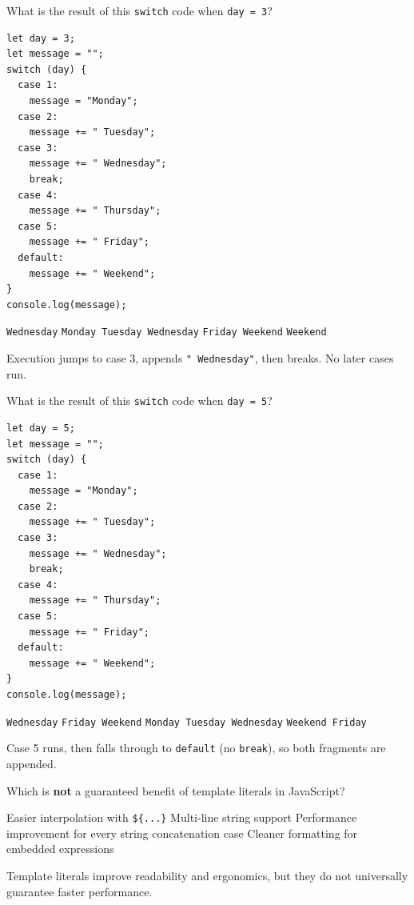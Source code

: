 \question[4]
What is the result of this \texttt{switch} code when \texttt{day = 3}?
\begin{lstlisting}[style=js]
let day = 3;
let message = "";
switch (day) {
  case 1:
    message = "Monday";
  case 2:
    message += " Tuesday";
  case 3:
    message += " Wednesday";
    break;
  case 4:
    message += " Thursday";
  case 5:
    message += " Friday";
  default:
    message += " Weekend";
}
console.log(message);
\end{lstlisting}
\begin{choices}
  \CorrectChoice \texttt{Wednesday}
  \choice \texttt{Monday Tuesday Wednesday}
  \choice \texttt{Friday Weekend}
  \choice \texttt{Weekend}
\end{choices}
\begin{solution}
  Execution jumps to case 3, appends \texttt{" Wednesday"}, then breaks. No later cases run.
\end{solution}

\question[4]
What is the result of this \texttt{switch} code when \texttt{day = 5}?
\begin{lstlisting}[style=js]
let day = 5;
let message = "";
switch (day) {
  case 1:
    message = "Monday";
  case 2:
    message += " Tuesday";
  case 3:
    message += " Wednesday";
    break;
  case 4:
    message += " Thursday";
  case 5:
    message += " Friday";
  default:
    message += " Weekend";
}
console.log(message);
\end{lstlisting}
\begin{choices}
  \choice \texttt{Wednesday}
  \CorrectChoice \texttt{Friday Weekend}
  \choice \texttt{Monday Tuesday Wednesday}
  \choice \texttt{Weekend Friday}
\end{choices}
\begin{solution}
  Case 5 runs, then falls through to \texttt{default} (no \texttt{break}), so both fragments are appended.
\end{solution}

\question[4]
Which is \textbf{not} a guaranteed benefit of template literals in JavaScript?
\begin{choices}
  \choice Easier interpolation with \texttt{\$\{...\}}
  \choice Multi-line string support
  \CorrectChoice Performance improvement for every string concatenation case
  \choice Cleaner formatting for embedded expressions
\end{choices}
\begin{solution}
  Template literals improve readability and ergonomics, but they do not universally guarantee faster performance.
\end{solution}

